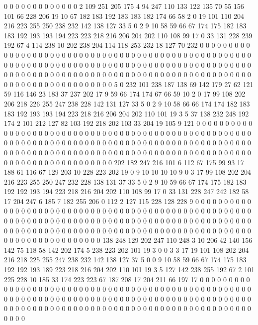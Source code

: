 0 0 0 0 0 0 0 0 0 0 0 0 0 2 109 251 205 175 4 94
247 110 133 122 135 70 55 156 101 66 228 206 19 10 67 182 183 192 183 183
182 174 66 58 2 0 19 101 110 204 216 223 255 250 238 232 142 138 127 33
5 0 2 9 10 58 59 66 67 174 175 182 183 183 192 193 193 194 223 223
218 216 206 204 202 110 108 99 17 0 33 131 228 239 192 67 4 114 238 10
202 238 204 114 118 253 232 18 127 70 232 0 0 0 0 0 0 0 0 0
0 0 0 0 0 0 0 0 0 0 0 0 0 0 0 0 0 0 0 0
0 0 0 0 0 0 0 0 0 0 0 0 0 0 0 0 0 0 0 0
0 0 0 0 0 0 0 0 0 0 0 0 0 0 0 0 0 0 0 0
0 0 0 0 0 0 0 0 0 0 0 0 0 0 0 0 0 0 0 0
0 0 0 0 0 0 0 0 0 0 0 0 0 0 0 0 0 0 0 0
0 0 0 0 0 0 0 0 0 0 0 0 0 0 0 0 0 0 0 0
0 0 0 0 0 0 0 0 0 0 0 0 0 0 0 0 0 0 0 0
0 0 0 0 0 0 0 0 5 0 232 101 238 187 138 69 142 179 27 62
121 59 116 146 23 183 37 237 202 17 9 59 66 174 174 67 66 59 10 2
0 17 99 108 202 206 218 226 255 247 238 228 142 131 127 33 5 0 2 9
10 58 66 66 174 174 182 183 183 192 193 193 194 223 218 216 206 204 202 110
101 19 3 5 37 138 232 248 192 174 2 101 212 127 82 103 192 218 202 103
33 204 19 105 9 121 0 0 0 0 0 0 0 0 0 0 0 0 0 0
0 0 0 0 0 0 0 0 0 0 0 0 0 0 0 0 0 0 0 0
0 0 0 0 0 0 0 0 0 0 0 0 0 0 0 0 0 0 0 0
0 0 0 0 0 0 0 0 0 0 0 0 0 0 0 0 0 0 0 0
0 0 0 0 0 0 0 0 0 0 0 0 0 0 0 0 0 0 0 0
0 0 0 0 0 0 0 0 0 0 0 0 0 0 0 0 0 0 0 0
0 0 0 0 0 0 0 0 0 0 0 0 0 0 0 0 0 0 0 0
0 0 0 0 0 0 0 0 0 0 0 0 0 0 0 0 0 0 0 0
0 0 0 0 202 182 247 216 101 6 112 67 175 99 93 17 188 61 116 67
129 203 10 228 223 202 19 0 9 10 10 10 10 9 0 3 17 99 108 202
204 216 223 255 250 247 232 228 138 131 37 33 5 0 2 9 10 59 66 67
174 175 182 183 192 192 193 194 223 218 216 204 202 110 108 99 17 0 33 131
228 247 242 182 58 17 204 247 6 185 7 182 255 206 0 112 2 127 115 228
128 228 9 0 0 0 0 0 0 0 0 0 0 0 0 0 0 0 0 0
0 0 0 0 0 0 0 0 0 0 0 0 0 0 0 0 0 0 0 0
0 0 0 0 0 0 0 0 0 0 0 0 0 0 0 0 0 0 0 0
0 0 0 0 0 0 0 0 0 0 0 0 0 0 0 0 0 0 0 0
0 0 0 0 0 0 0 0 0 0 0 0 0 0 0 0 0 0 0 0
0 0 0 0 0 0 0 0 0 0 0 0 0 0 0 0 0 0 0 0
0 0 0 0 0 0 0 0 0 0 0 0 0 0 0 0 0 0 0 0
0 0 0 0 0 0 0 0 0 0 0 0 0 0 0 0 0 0 0 138
248 129 202 247 110 248 3 10 206 42 140 156 142 75 118 58 142 202 174 5
238 223 202 101 19 3 0 0 3 3 17 19 101 108 202 204 216 218 225 255
247 238 232 142 138 127 37 5 0 0 9 10 58 59 66 67 174 175 183 192
192 193 189 223 218 216 204 202 110 101 19 3 5 127 142 238 255 192 67 2
101 225 228 10 185 33 174 223 223 67 187 208 17 204 211 66 197 17 0 0
0 0 0 0 0 0 0 0 0 0 0 0 0 0 0 0 0 0 0 0
0 0 0 0 0 0 0 0 0 0 0 0 0 0 0 0 0 0 0 0
0 0 0 0 0 0 0 0 0 0 0 0 0 0 0 0 0 0 0 0
0 0 0 0 0 0 0 0 0 0 0 0 0 0 0 0 0 0 0 0
0 0 0 0 0 0 0 0 0 0 0 0 0 0 0 0 0 0 0 0
0 0 0 0 0 0 0 0 0 0 0 0 0 0 0 0 0 0 0 0
0 0 0 0 0 0 0 0 0 0 0 0 0 0 0 0 0 0 0 0
